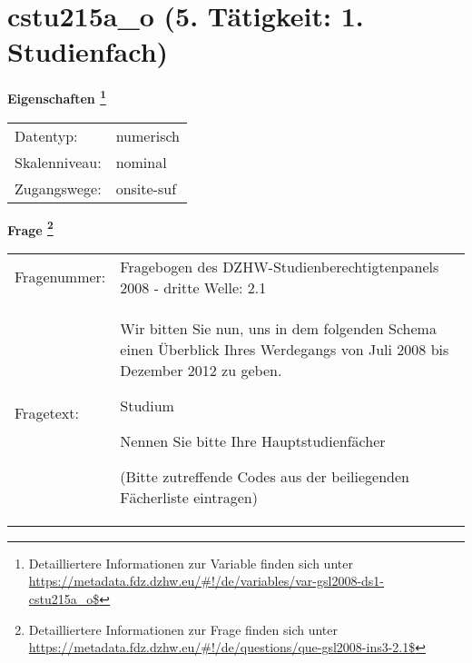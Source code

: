 
    \setcounter{footnote}{0}

    \vspace*{-1.8cm}
	\section{cstu215a\_o (5. Tätigkeit: 1. Studienfach)}
	\label{section:cstu215a_o}



    \vspace*{0.5cm}
    \noindent\textbf{Eigenschaften
	\footnote{Detailliertere Informationen zur Variable finden sich unter
		\url{https://metadata.fdz.dzhw.eu/\#!/de/variables/var-gsl2008-ds1-cstu215a_o$}}}\\
	\begin{tabularx}{\hsize}{@{}lX}
	Datentyp: & numerisch \\
	Skalenniveau: & nominal \\
	Zugangswege: &
	  onsite-suf
 \\
    \end{tabularx}



				\vspace*{0.5cm}
                \noindent\textbf{Frage
	                \footnote{Detailliertere Informationen zur Frage finden sich unter
		              \url{https://metadata.fdz.dzhw.eu/\#!/de/questions/que-gsl2008-ins3-2.1$}}}\\
				\begin{tabularx}{\hsize}{@{}lX}
					Fragenummer: &
					  Fragebogen des DZHW-Studienberechtigtenpanels 2008 - dritte Welle:
					  2.1
 \\
					Fragetext: & Wir bitten Sie nun, uns in dem folgenden Schema einen Überblick Ihres Werdegangs von Juli 2008 bis Dezember 2012 zu geben.\par  Studium\par  Nennen Sie bitte Ihre Hauptstudienfächer\par  (Bitte zutreffende Codes aus der beiliegenden Fächerliste eintragen) \\
				\end{tabularx}





